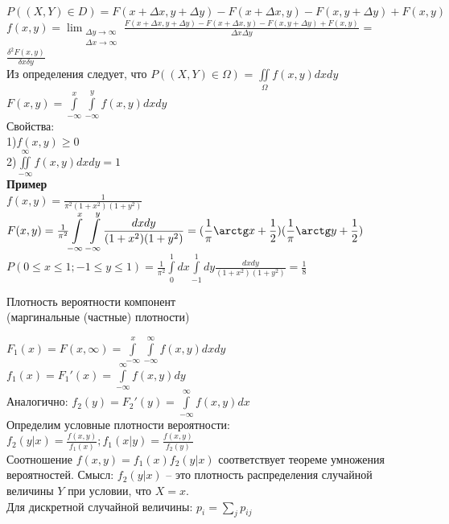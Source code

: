 \documentclass[russian, 12pt, fleqn]{article}
\begin{document}
$P((X, Y) \in D) = F(x + \Delta x, y + \Delta y) -  F(x + \Delta x, y ) -  F(x , y + \Delta y) +  F(x , y )$ \\
$f(x, y)=  \displaystyle{  \lim_{\substack{{\Delta y\to{\infty}}\\ {\Delta x\to{\infty}}}}} \frac{ F(x + \Delta x, y + \Delta y) -  F(x + \Delta x, y ) -  F(x , y + \Delta y) +  F(x , y )}{\Delta x \Delta y}$ = $\frac{\delta^2 F(x, y)}{\delta x \delta y}$\\
Из  определения следует, что $P((X, Y) \in \Omega)$  = $\displaystyle{\iint\limits_{\Omega}} f(x, y)dxdy$\\
$F(x, y) = \displaystyle{\int\limits_{-\infty}^{x} \int\limits_{-\infty}^{y} f(x, y) dx dy}$\\
Свойства:\\
1)$f(x, y) \geq 0$\\
2)$\iint\limits_{-\infty}^{\infty} f(x, y) dxdy = 1$\\
\textbf{Пример} \\
$f(x, y) = \frac{1}{\pi^2(1+x^2)(1+y^2)}$\\
$F(x, y) = \frac{1}{\pi^2} \displaystyle{\int\limits_{-\infty}^{x}  \int\limits_{-\infty}^{y}} \frac{dxdy}{(1+x^2)(1+y^2)} = (\frac{1}{\pi}\arctg x + \frac{1}{2}) (\frac{1}{\pi}\arctg y + \frac{1}{2})$\\
$P(0\leq x \leq 1; -1 \leq y \leq 1) = \frac{1}{\pi^2} \displaystyle{\int\limits_{0}^{1}dx\int\limits_{-1}^{1} dy \frac{dxdy}{(1+x^2)(1+y^2)}} = \frac{1}{8}$
\begin{center}
$\textbf{Плотность вероятности компонент}$\\
(маргинальные (частные) плотности)
\end{center}
$F_1(x) = F(x, \infty)  = \displaystyle{\int\limits_{-\infty}^{x}\int\limits_{-\infty}^{\infty}f(x, y)dxdy}$\\
$f_1(x) = F_1'(x) = \displaystyle{\int \limits_{-\infty}^{\infty}} f(x, y) dy$\\
Аналогично: $f_2(y) = F_2'(y) = \displaystyle{\int \limits_{-\infty}^{\infty}} f(x, y) dx$\\
Определим условные плотности вероятности: $f_2(y|x) = \frac{f(x,y)}{f_1(x)};f_1(x|y) = \frac{f(x,y)}{f_2(y)}$\\
Соотношение $f(x, y) = f_1(x) f_2(y|x)$ соответствует теореме умножения вероятностей. Смысл: $f_2(y|x)$ -- это плотность распределения случайной величины $Y$ при условии, что $X=x$.\\
Для дискретной случайной величины: $p_i = \sum\limits_{j} p_{ij}$\\
\end{document}
